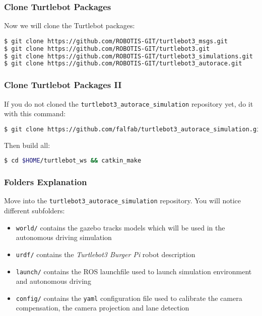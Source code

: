 
\begin{frame}[fragile]
	\frametitle{Clone Turtlebot Packages}
Now we will clone the Turtlebot packages:

\begin{lstlisting}[language=bash]
$ git clone https://github.com/ROBOTIS-GIT/turtlebot3_msgs.git
$ git clone https://github.com/ROBOTIS-GIT/turtlebot3.git
$ git clone https://github.com/ROBOTIS-GIT/turtlebot3_simulations.git
$ git clone https://github.com/ROBOTIS-GIT/turtlebot3_autorace.git
\end{lstlisting}

\end{frame}

\begin{frame}[fragile]
\frametitle{Clone Turtlebot Packages II}
If you do not cloned the \verb$turtlebot3_autorace_simulation$ repository yet, do it with this command:
\begin{lstlisting}[language=bash]
$ git clone https://github.com/falfab/turtlebot3_autorace_simulation.git
\end{lstlisting}

Then build all:
\begin{lstlisting}[language=bash]
$ cd $HOME/turtlebot_ws && catkin_make
\end{lstlisting}

\end{frame}


\begin{frame}[fragile]
	\frametitle{Folders Explanation}
	Move into the \verb|turtlebot3_autorace_simulation| repository. You will notice different subfolders:
	\begin{itemize}
		\item \texttt{world/} contains the gazebo tracks models which will be used in the autonomous driving simulation
		\item \texttt{urdf/} contains the \textit{Turtlebot3 Burger Pi} robot description
		\item \texttt{launch/} contains the ROS launchfile used to launch simulation environment and autonomous driving 
		\item \texttt{config/} contains the \verb$yaml$ configuration file used to calibrate the camera compensation, the camera projection and lane detection
	\end{itemize}
\end{frame}

